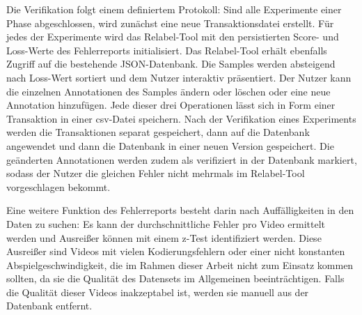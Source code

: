 Die Verifikation folgt einem definiertem Protokoll:
Sind alle Experimente einer Phase abgeschlossen, wird zunächst eine neue Transaktionsdatei erstellt.
Für jedes der Experimente wird das Relabel-Tool mit den persistierten Score- und Loss-Werte des Fehlerreports initialisiert.
Das Relabel-Tool erhält ebenfalls Zugriff auf die bestehende JSON-Datenbank.
Die Samples werden absteigend nach Loss-Wert sortiert und dem Nutzer interaktiv präsentiert.
Der Nutzer kann die einzelnen Annotationen des Samples ändern oder löschen oder eine neue Annotation hinzufügen.
Jede dieser drei Operationen lässt sich in Form einer Transaktion in einer \gls{csv}-Datei speichern.
Nach der Verifikation eines Experiments werden die Transaktionen separat gespeichert, dann auf die Datenbank angewendet und dann die Datenbank in einer neuen Version gespeichert.
Die geänderten Annotationen werden zudem als verifiziert in der Datenbank markiert, sodass der Nutzer die gleichen Fehler nicht mehrmals im Relabel-Tool vorgeschlagen bekommt.

Eine weitere Funktion des Fehlerreports besteht darin nach Auffälligkeiten in den Daten zu suchen:
Es kann der durchschnittliche Fehler pro Video ermittelt werden und Ausreißer können mit einem z-Test identifiziert werden.
Diese Ausreißer sind \zB Videos mit vielen Kodierungsfehlern oder einer nicht konstanten Abspielgeschwindigkeit, die im Rahmen dieser Arbeit nicht zum Einsatz kommen sollten, da sie die Qualität des Datensets im Allgemeinen beeinträchtigen.
Falls die Qualität dieser Videos inakzeptabel ist, werden sie manuell aus der Datenbank entfernt.
